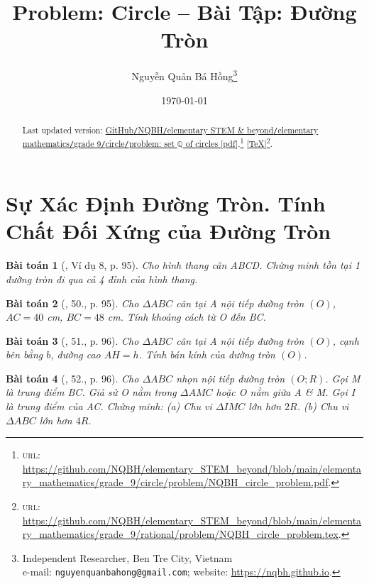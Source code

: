 \documentclass{article}
\title{Problem: Circle -- Bài Tập: Đường Tròn}
\author{Nguyễn Quản Bá Hồng\footnote{Independent Researcher, Ben Tre City, Vietnam\\e-mail: \texttt{nguyenquanbahong@gmail.com}; website: \url{https://nqbh.github.io}.}}
\date{\today}
\newtheorem{baitoan}{Bài toán}
\begin{document}
\maketitle
\begin{abstract}
	Last updated version: \href{https://github.com/NQBH/elementary_STEM_beyond/blob/main/elementary_mathematics/grade_9/circle/problem/NQBH_circle_problem.pdf}{GitHub{\tt/}NQBH{\tt/}elementary STEM \& beyond{\tt/}elementary mathematics{\tt/}grade 9{\tt/}circle{\tt/}problem: set $\mathbb{Q}$ of circles [pdf]}.\footnote{\textsc{url}: \url{https://github.com/NQBH/elementary_STEM_beyond/blob/main/elementary_mathematics/grade_9/circle/problem/NQBH_circle_problem.pdf}.} [\href{https://github.com/NQBH/elementary_STEM_beyond/blob/main/elementary_mathematics/grade_9/circle/problem/NQBH_circle_problem.tex}{\TeX}]\footnote{\textsc{url}: \url{https://github.com/NQBH/elementary_STEM_beyond/blob/main/elementary_mathematics/grade_9/rational/problem/NQBH_circle_problem.tex}.}. 
\end{abstract}
\tableofcontents


\section{Sự Xác Định Đường Tròn. Tính Chất Đối Xứng của Đường Tròn}

\begin{baitoan}[\cite{Binh_Toan_9_tap_1}, Ví dụ 8, p. 95]
	Cho hình thang cân ABCD. Chứng minh tồn tại 1 đường tròn đi qua cả 4 đỉnh của hình thang.
\end{baitoan}

\begin{baitoan}[\cite{Binh_Toan_9_tap_1}, 50., p. 95]
	Cho $\Delta ABC$ cân tại A nội tiếp đường tròn $(O)$, $AC = 40$ {\rm cm}, $BC = 48$ {\rm cm}. Tính khoảng cách từ O đến BC. 
\end{baitoan}

\begin{baitoan}[\cite{Binh_Toan_9_tap_1}, 51., p. 96]
	Cho $\Delta ABC$ cân tại A nội tiếp đường tròn $(O)$, cạnh bên bằng $b$, đường cao $AH = h$. Tính bán kính của đường tròn $(O)$.
\end{baitoan}

\begin{baitoan}[\cite{Binh_Toan_9_tap_1}, 52., p. 96]
	Cho $\Delta ABC$ nhọn nội tiếp đường tròn $(O;R)$. Gọi M là trung điểm BC. Giả sử O nằm trong $\Delta AMC$ hoặc O nằm giữa A \& M. Gọi I là trung điểm của AC. Chứng minh: (a) Chu vi $\Delta IMC$ lớn hơn $2R$. (b) Chu vi $\Delta ABC$ lớn hơn $4R$.
\end{baitoan}
\end{document}

